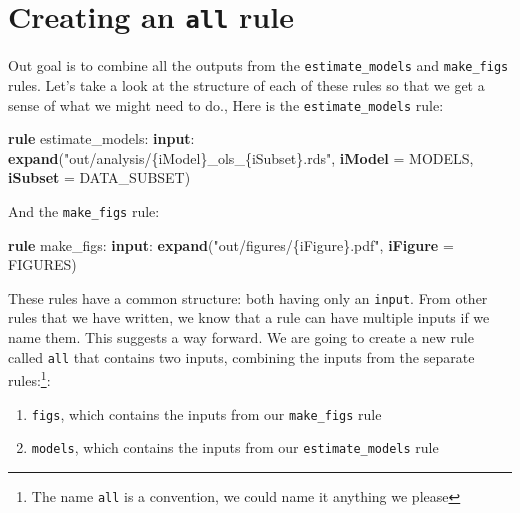 \documentclass[]{book}
\newenvironment{Shaded}{\begin{snugshade}}{\end{snugshade}}
\newcommand{\KeywordTok}[1]{\textcolor[rgb]{0.13,0.29,0.53}{\textbf{{#1}}}}
\newcommand{\StringTok}[1]{\textcolor[rgb]{0.31,0.60,0.02}{{#1}}}
\newcommand{\NormalTok}[1]{{#1}}
\providecommand{\tightlist}{%
  \setlength{\itemsep}{0pt}\setlength{\parskip}{0pt}}
\let\rmarkdownfootnote\footnote%
\def\footnote{\protect\rmarkdownfootnote}
\theoremstyle{definition}
\theoremstyle{definition}
\theoremstyle{definition}
\theoremstyle{remark}
\begin{document}
\section{\texorpdfstring{Creating an \texttt{all}
rule}{Creating an all rule}}\label{creating-an-all-rule}

Out goal is to combine all the outputs from the
\texttt{estimate\_models} and \texttt{make\_figs} rules. Let's take a
look at the structure of each of these rules so that we get a sense of
what we might need to do., Here is the \texttt{estimate\_models} rule:

\begin{Shaded}
\begin{Highlighting}[]
\KeywordTok{rule} \NormalTok{estimate_models:}
    \KeywordTok{input}\NormalTok{:}
        \KeywordTok{expand}\NormalTok{(}\StringTok{"out/analysis/\{iModel\}_ols_\{iSubset\}.rds"}\NormalTok{,}
                    \KeywordTok{iModel} \NormalTok{= MODELS,}
                    \KeywordTok{iSubset} \NormalTok{= DATA_SUBSET)}
\end{Highlighting}
\end{Shaded}

And the \texttt{make\_figs} rule:

\begin{Shaded}
\begin{Highlighting}[]
\KeywordTok{rule} \NormalTok{make_figs:}
    \KeywordTok{input}\NormalTok{:}
        \KeywordTok{expand}\NormalTok{(}\StringTok{"out/figures/\{iFigure\}.pdf"}\NormalTok{,}
                \KeywordTok{iFigure} \NormalTok{= FIGURES)}
\end{Highlighting}
\end{Shaded}

These rules have a common structure: both having only an \texttt{input}.
From other rules that we have written, we know that a rule can have
multiple inputs if we name them. This suggests a way forward. We are
going to create a new rule called \texttt{all} that contains two inputs,
combining the inputs from the separate rules:\footnote{The name
  \texttt{all} is a convention, we could name it anything we please}:

\begin{enumerate}
\def\labelenumi{\arabic{enumi}.}
\tightlist
\item
  \texttt{figs}, which contains the inputs from our \texttt{make\_figs}
  rule
\item
  \texttt{models}, which contains the inputs from our
  \texttt{estimate\_models} rule
\end{enumerate}
\end{document}
